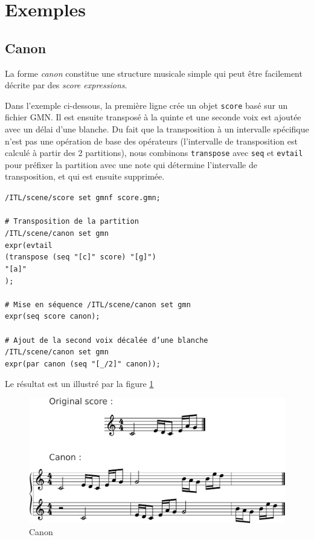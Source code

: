 \documentclass{article}
\newcommand{\OSC}[1]{\texttt{#1}}
\newcommand{\sExprs}{\emph{score expressions}}
\newcommand{\tab}{\hspace*{4mm}}
\newcommand{\sample}	[1]			{\vspace{-0.2em}\begin{center}\colorbox{mygrey}{\begin{minipage}[t]{0.97\columnwidth} {\small \texttt{#1}}\end{minipage}}\end{center}}
\begin{document}
\section{Exemples}
\label{examples}

\subsection{Canon}

La forme \emph{canon} constitue une structure musicale simple qui peut être facilement décrite par des \sExprs.

Dans l'exemple ci-dessous, la première ligne crée un objet \OSC{score} basé sur un fichier GMN. Il est ensuite transposé à la quinte et une seconde voix est ajoutée avec un délai d'une blanche. Du fait que la transposition à un intervalle spécifique n'est pas une opération de base des opérateurs (l'intervalle de transposition est calculé à partir des 2 partitions), nous combinons \OSC{transpose} avec \OSC{seq} et \OSC{evtail} pour préfixer la partition avec une note qui détermine l'intervalle de transposition, et qui est ensuite supprimée.

\sample{/ITL/scene/score set gmnf score.gmn;\\
\\
\# Transposition de la partition\\
/ITL/scene/canon set gmn\\
\tab expr(evtail\\
\tab\tab(transpose (seq "[c]" score) "[g]")\\
\tab\tab"[a]"\\
\tab);\\
\\
\# Mise en séquence
/ITL/scene/canon set gmn\\
\tab expr(seq score canon);\\
\\
\# Ajout de la second voix décalée d'une blanche\\
/ITL/scene/canon set gmn\\
\tab expr(par canon (seq "[\_/2]" canon));
}
Le résultat est un illustré par la figure \ref{fig:canonFig}
\begin{figure}[th]
\centering
\includegraphics[width=1.\columnwidth]{imgs/exampleCanon}
\caption{Canon
\label{fig:canonFig}}
\end{figure}
\end{document}
